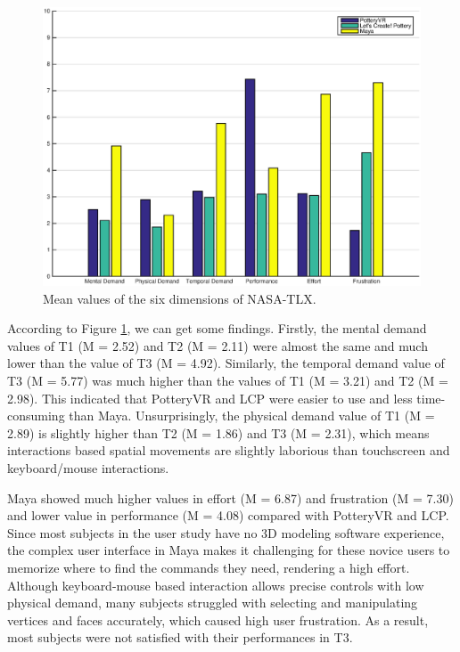 \documentclass{svjour3}                     %
\begin{document}
\begin{figure}
	\includegraphics[width=\textwidth]{tlx.eps}
	\caption{Mean values of the six dimensions of NASA-TLX.}
	\label{fig:tlx}
\end{figure}

According to Figure \ref{fig:tlx}, we can get some findings. 
Firstly, the mental demand values of T1 (M = 2.52) and T2 (M = 2.11) were almost the same and much lower than the value of T3 (M = 4.92). Similarly, the temporal demand value of T3 (M = 5.77) was much higher than the values of T1 (M = 3.21) and T2 (M = 2.98). This indicated that PotteryVR and LCP were easier to use and less time-consuming than Maya. Unsurprisingly, the physical demand value of T1 (M = 2.89) is slightly higher than T2 (M = 1.86) and T3 (M = 2.31), which means interactions based spatial movements are slightly laborious than touchscreen and keyboard/mouse interactions.

Maya showed much higher values in effort (M = 6.87) and frustration (M = 7.30) and lower value in performance (M = 4.08) compared with PotteryVR and LCP.
Since most subjects in the user study have no 3D modeling software experience, the complex user interface in Maya makes it challenging for these novice users to memorize where to find the commands they need, rendering a high effort.
Although keyboard-mouse based interaction allows precise controls with low physical demand, many subjects struggled with selecting and manipulating vertices and faces accurately, which caused high user frustration. As a result, most subjects were not satisfied with their performances in T3.
\end{document}
